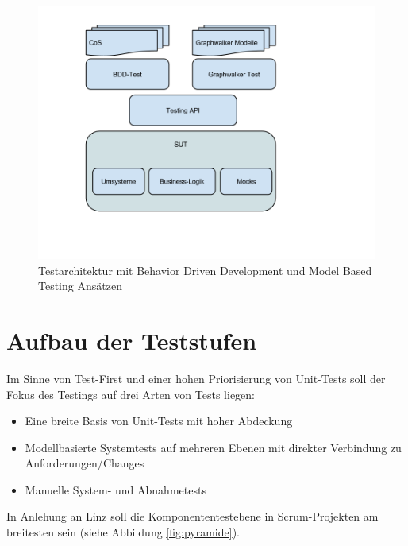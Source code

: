 \begin{figure}[h] 
  \centering
     \includegraphics[width=1.0\textwidth]{figures/Testarchitektur-MBT-BDD-COS.png}
  \caption{Testarchitektur mit Behavior Driven Development und Model Based Testing Ansätzen}
  \label{fig:testarchitektur}
\end{figure}

\section{Aufbau der Teststufen}
Im Sinne von \Gls{Test-First} und einer hohen Priorisierung von Unit-Tests soll der Fokus des Testings auf drei Arten von Tests liegen:

\begin{itemize}
\item Eine breite Basis von Unit-Tests mit hoher Abdeckung
\item Modellbasierte Systemtests auf mehreren Ebenen mit direkter Verbindung zu Anforderungen/Changes
\item Manuelle System- und Abnahmetests
\end{itemize}

In Anlehung an Linz \cite{linz_testing_2014} soll die Komponententestebene in Scrum-Projekten am breitesten sein (siehe Abbildung \ref{fig:pyramide}).

